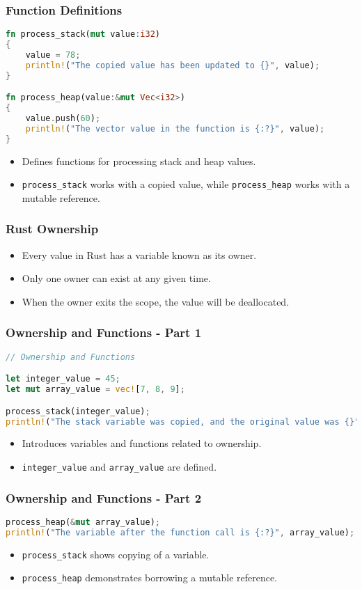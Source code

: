 \documentclass[aspectratio=169, table]{beamer}
\begin{document}
\begin{frame}[fragile]
\frametitle{Function Definitions}
\vspace{12pt}
\begin{lstlisting}[language=Rust]
fn process_stack(mut value:i32)    
{   
	value = 78; 
	println!("The copied value has been updated to {}", value); 
}

fn process_heap(value:&mut Vec<i32>)    
{
	value.push(60);    
	println!("The vector value in the function is {:?}", value); 
}
\end{lstlisting}
\begin{itemize}
\item Defines functions for processing stack and heap values.
\item \texttt{process\_stack} works with a copied value, while \texttt{process\_heap} works with a mutable reference.
\end{itemize}
\end{frame}

\begin{frame}[fragile]
\frametitle{Rust Ownership}
\begin{itemize}
\item Every value in Rust has a variable known as its owner.
\item Only one owner can exist at any given time.
\item When the owner exits the scope, the value will be deallocated.
\end{itemize}
\end{frame}

\begin{frame}[fragile]
\frametitle{Ownership and Functions - Part 1}
\begin{lstlisting}[language=Rust]
// Ownership and Functions

let integer_value = 45;  
let mut array_value = vec![7, 8, 9]; 

process_stack(integer_value); 
println!("The stack variable was copied, and the original value was {}", integer_value);
\end{lstlisting}
\begin{itemize}
\item Introduces variables and functions related to ownership.
\item \texttt{integer\_value} and \texttt{array\_value} are defined.
\end{itemize}
\end{frame}

\begin{frame}[fragile]
\frametitle{Ownership and Functions - Part 2}
\begin{lstlisting}[language=Rust]
process_heap(&mut array_value);  
println!("The variable after the function call is {:?}", array_value);  

\end{lstlisting}
\begin{itemize}
\item \texttt{process\_stack} shows copying of a variable.
\item \texttt{process\_heap} demonstrates borrowing a mutable reference.
\end{itemize}
\end{frame}
\end{document}
